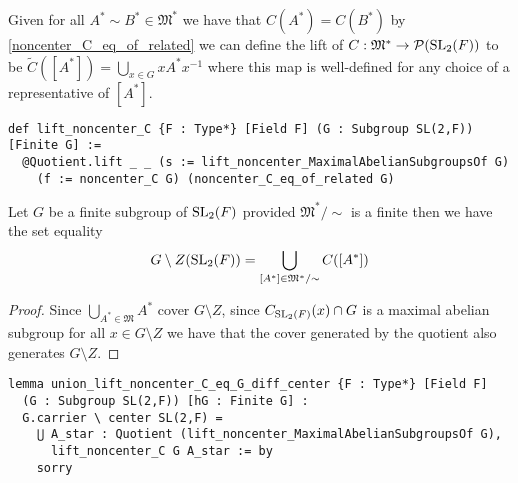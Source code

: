 \begin{definition}
\label{lift_noncenter_C}
\leanok
 Given for all $A^* \sim B^* \in \mathfrak{M}^*$ we have that $C(A^*) = C(B^*)$ by \ref{noncenter_C_eq_of_related} we can define the lift of $C : \mathfrak{M}^* \rightarrow \mathcal{P}(\operatorname{SL}_2(F))$ to be 
  $\tilde{C}([A^*]) = \bigcup_{x \in G} x A^* x^{-1}$ where this map is well-defined for any choice of a representative of $[A^*]$.
\end{definition}
\begin{footnotesize}
\begin{verbatim}
def lift_noncenter_C {F : Type*} [Field F] (G : Subgroup SL(2,F)) [Finite G] :=
  @Quotient.lift _ _ (s := lift_noncenter_MaximalAbelianSubgroupsOf G)
    (f := noncenter_C G) (noncenter_C_eq_of_related G)
\end{verbatim}
\end{footnotesize}

\begin{theorem}
\label{union_lift_noncenter_C_eq_G_diff_center}
  Let $G$ be a finite subgroup of $\operatorname{SL}_2(F)$ provided $\mathfrak{M}^* / \sim$ is a finite then we have the set equality
  \[
   G \setminus Z(\operatorname{SL}_2(F)) = \bigcup_{[A^*] \in \mathfrak{M}^* / \sim} C([A^*])
  \]
\end{theorem}
\begin{proof}
  Since $\bigcup_{A^* \in \mathfrak{M}} A^*$ cover $G \setminus Z$, since $C_{\operatorname{SL}_2(F)}(x) \cap G$ is a maximal abelian subgroup for all $x \in G \setminus Z$
  we have that the cover generated by the quotient also generates $G \setminus Z$.
\end{proof}
\begin{footnotesize}
\begin{verbatim}
lemma union_lift_noncenter_C_eq_G_diff_center {F : Type*} [Field F]
  (G : Subgroup SL(2,F)) [hG : Finite G] :
  G.carrier \ center SL(2,F) =
    ⋃ A_star : Quotient (lift_noncenter_MaximalAbelianSubgroupsOf G),
      lift_noncenter_C G A_star := by
    sorry
\end{verbatim}
\end{footnotesize}

